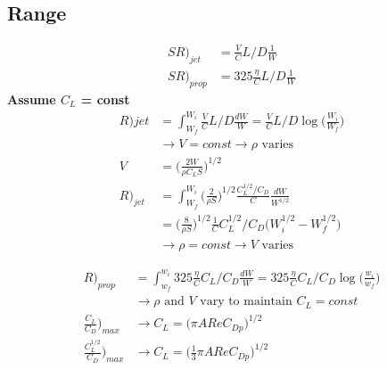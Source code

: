 \documentclass[draft=false, titlepage]{article}
\begin{document}
\subsection{Range}
\begin{align}
SR\big)_{jet} &= \frac{V}{C} L/D \frac{1}{W}\\
SR\big)_{prop} &= 325\frac{\eta}{C}L/D \frac{1}{W}
\end{align}
\textbf{Assume $C_L$ = const}
\begin{align*}
R\big){jet} &= \int_{W_f}^{W_i} \frac{V}{C} L/D \frac{dW}{W} = \frac{V}{C} L/D \log \Big(\frac{W_i}{W_f}\Big)\\
&\rightarrow V = const \rightarrow \rho \text{ varies}\\
V &= \Big(\frac{2W}{\rho C_L S}\Big)^{1/2}\\
R\big)_{jet} &= \int_{W_f}^{W_i} \Big(\frac{2}{\rho S}\Big)^{1/2} \frac{C_L^{1/2}/C_D}{C} \frac{dW}{W^{1/2}}\\
&= \Big(\frac{8}{\rho S}\Big)^{1/2} \frac{1}{C} C_L^{1/2}/C_D \big(W_i^{1/2} - W_f^{1/2}\big)\\
&\rightarrow \rho = const \rightarrow V \text{ varies}
\end{align*}

\begin{align*}
R\big)_{prop} &= \int_{w_f}^{w_i} 325 \frac{\eta}{C} C_L/C_D \frac{dW}{W} = 325 \frac{\eta}{C} C_L/C_D \log\Big(\frac{w_i}{w_f}\Big)\\
&\rightarrow \rho \text{ and } V \text{ vary to maintain } C_L = const\\
\frac{C_L}{C_D}\Big)_{max} &\rightarrow C_L = \big(\pi AR e C_{Dp}\big)^{1/2}\\
\frac{C_L^{1/2}}{C_D}\Big)_{max} &\rightarrow C_L = \big(\frac{1}{3} \pi AR e C_{Dp}\big)^{1/2}
\end{align*}

\end{document}
